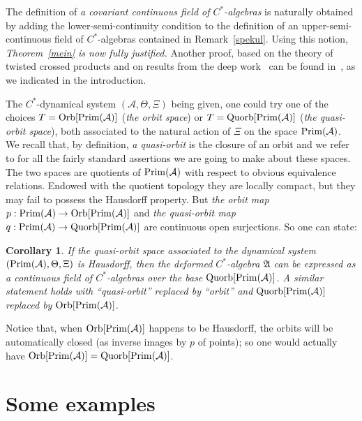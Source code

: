 \documentclass[pdftex]{sigma}
\def\A{{\mathcal A}}
\def\Th{\Theta}
\def\AA{\mathfrak A}
\newtheorem{Corollary}[Theorem]{Corollary}
\begin{document}
\begin{Remark}\label{harto}
The def\/inition of {\it a covariant continuous field of $C^*$-algebras} is naturally obtained by adding the lower-semi-continuity condition to the def\/inition of an upper-semi-continuous f\/ield of $C^*$-algebras contained in Remark~\ref{spekul}. Using this notion, {\it Theorem~{\rm \ref{mein}} is now fully justified.}
Another proof, based on the theory of twisted crossed products and on results from the deep work~\cite{Rie} can be found in~\cite{BM}, as we indicated in the introduction.
\end{Remark}

The $C^*$-dynamical system $(\A,\Th,\Xi)$ being given, one could try one of the choices $T={\rm Orb}[{\rm Prim}(\A)]$
({\it the orbit space}) or $T={\rm Quorb}[{\rm Prim}(\A)]$ ({\it the quasi-orbit space}), both associated to the natural
action of $\Xi$ on the space ${\rm Prim}(\A)$. We recall that, by def\/inition, {\it a quasi-orbit} is the closure of an orbit
and we refer to \cite{Wi} for all the fairly standard assertions we are \mbox{going} to make about these spaces.
The two spaces are quotients of ${\rm Prim}(\A)$ with respect to obvious equivalence relations.
Endowed with the quotient topology they are locally compact, but they may fail to possess the Hausdorf\/f property.
But {\it the orbit map} $p:{\rm Prim}(\A)\rightarrow{\rm Orb}[{\rm Prim}(\A)]$ and
{\it the quasi-orbit map} $q:{\rm Prim}(\A)\rightarrow{\rm Quorb}[{\rm Prim}(\A)]$ are continuous open surjections.
So one can state:

\begin{Corollary}\label{nech}
If the quasi-orbit space associated to the dynamical system
$({\rm Prim}(\A),\Th,\Xi)$ is Hausdorff, then the deformed $C^*$-algebra $\AA$ can be expressed as a continuous field of
$C^*$-algebras over the base ${\rm Quorb}[{\rm Prim}(\A)]$.
A similar statement holds with ``quasi-orbit'' replaced by ``orbit'' and ${\rm Quorb}[{\rm Prim}(\A)]$ replaced
by ${\rm Orb}[{\rm Prim}(\A)]$.
\end{Corollary}

Notice that, when ${\rm Orb}[{\rm Prim}(\A)]$ happens to be Hausdorf\/f, the orbits will be automatically closed
(as inverse images by $p$ of points); so
one would actually have ${\rm Orb}[{\rm Prim}(\A)]={\rm Quorb}[{\rm Prim}(\A)]$.


\section{Some examples}\label{seretide}
\end{document}
